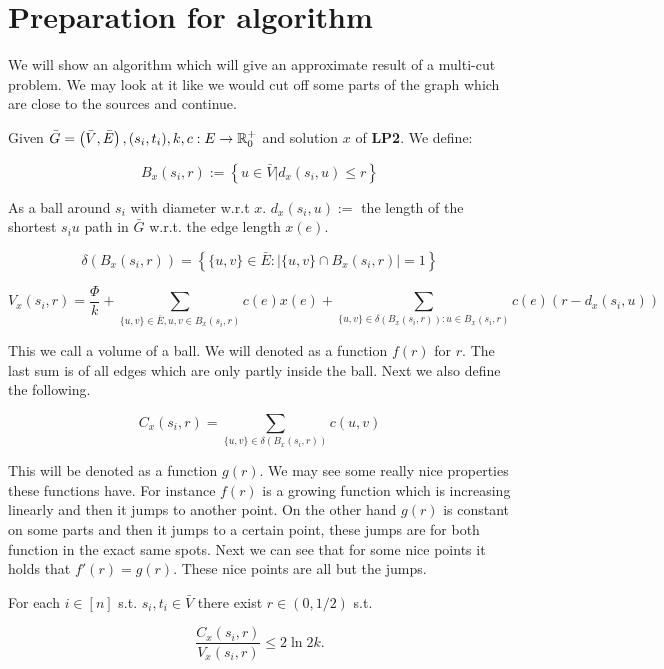 \section{Preparation for algorithm}

We will show an algorithm which will give an approximate result of a multi-cut problem. We may look at it like we would cut off some parts of the graph which are close to the sources and continue.

Given $\bar{G} = \left(\bar{V}, \bar{E}\right), (s_{i}, t_{i}), k, c: E \to \mathbb{R}_{0}^{+}$ and solution $x$ of \textbf{LP2}. We define:

$$
B_{x}(s_{i}, r) := \left\{u \in \bar{V} | d_{x} (s_{i}, u) \leq r\right\}
$$

As a ball around $s_{i}$ with diameter w.r.t $x$. $d_{x} (s_{i}, u) :=$ the length of the shortest $s_{i}u$ path in $\bar{G}$ w.r.t. the edge length $x(e)$.

$$
\delta (B_{x}(s_{i}, r)) = \left\{\{u,v\} \in \bar{E} : |\{u,v\} \cap B_{x}(s_{i}, r)| = 1\right\}
$$

$$
V_{x}(s_{i}, r) = \frac{\Phi}{k} + \sum_{\{u,v\} \in \bar{E}, u,v \in B_{x}(s_{i},r)} c(e)x(e) + \sum_{\{u,v\} \in \delta(B_{x}(s_{i},r)): u \in B_{x}(s_{i},r)} c(e) (r - d_{x}(s_{i}, u))
$$

This we call a volume of a ball. We will denoted as a function $f(r)$ for $r$. The last sum is of all edges which are only partly inside the ball. Next we also define the following.

$$
C_{x}(s_{i}, r) = \sum_{\{u,v\} \in \delta(B_{x}(s_{i},r))} c(u,v)
$$

This will be denoted as a function $g(r)$. We may see some really nice properties these functions have. For instance $f(r)$ is a growing function which is increasing linearly and then it jumps to another point. On the other hand $g(r)$ is constant on some parts and then it jumps to a certain point, these jumps are for both function in the exact same spots. Next we can see that for some nice points it holds that $f'(r) = g(r)$. These nice points are all but the jumps.

\begin{lemma}
	For each $i \in [n]$ s.t. $s_{i}, t_{i} \in \bar{V}$ there exist $r \in (0, 1/2)$ s.t.
	
	$$
	\frac{C_{x}(s_{i}, r)}{V_{x}(s_{i},r)} \leq 2 \ln 2k.
	$$
	\label{multi cut lemma}
\end{lemma}

